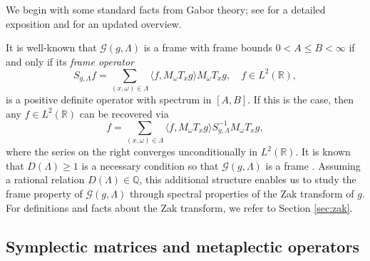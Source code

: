 \documentclass[reqno,a4paper,12pt]{amsart}
\numberwithin{equation}{section}
\newcommand{\R}{\mathbb R}
\newcommand{\Q}{\mathbb Q}
\newcommand{\calG}{\mathcal G}
\begin{document}
We begin with some standard facts from Gabor theory; see \cite{Groechenig2001,Folland1989} for a detailed exposition and \cite{GroechenigKoppensteiner2019} for an updated overview.

It is well-known that $\calG(g,\Lambda)$ is a frame with frame bounds $0<A\leq B<\infty$ if and only if its \emph{frame operator}
\begin{equation}
    S_{g,\Lambda} f=\sum_{(x,\omega)\in\Lambda} 
    \langle f,M_{\omega}T_{x} g\rangle 
    M_{\omega}T_{x} g, \quad f\in L^2(\R),
\end{equation}
is a positive definite operator with spectrum in $[A,B]$. If this is the case, then any $f\in L^2(\R)$ can be recovered via
\begin{equation}
    f = \sum_{(x,\omega)\in\Lambda} 
    \langle f,M_{\omega}T_{x} g\rangle 
    S_{g,\Lambda}^{-1} M_{\omega}T_{x} g,
\end{equation}
where the series on the right converges unconditionally in $L^2(\R)$.
It is known that $D(\Lambda)\geq 1$ is a necessary condition so that $\calG(g,\Lambda)$ is a frame \cite{Heil2007}.
Assuming a rational relation $D(\Lambda)\in\Q$, this additional structure enables us to study the frame property of $\calG(g,\Lambda)$ through spectral properties of the Zak transform of $g$. For definitions and facts about the Zak transform, we refer to Section \ref{sec:zak}.

\subsection{Symplectic matrices and metaplectic operators}
\end{document}
